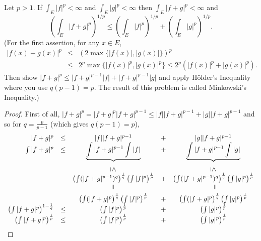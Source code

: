 \begin{pblm}%
	Let $p > 1$. If $\int_E|f|^p<\infty$ and $\int_E|g|^p<\infty$ then $\int_E|f+g|^p<\infty$ 
	and 
	\begin{equation*}
		\left(\int_E|f+g|^p\right)^{1/p} \le \left(\int_E|f|^p\right)^{1/p} + 
					\left(\int_E|g|^p\right)^{1/p}.
	\end{equation*}
	{\scriptsize{(For the first assertion, for any $x \in E$, 
	\begin{equation*}
	\begin{array}{rcl}
		|f(x)+g(x)|^p & \le &  (2\max\{|f(x)|,|g(x)|\})^p\\
				& \le & 2^p\max\{|f(x)|^p,|g(x)|^p\} 
				\le 2^p(|f(x)|^p + |g(x)|^p). 
	\end{array}
	\end{equation*}
	Then show $|f+g|^p \le |f+g|^{p-1}|f|+|f+g|^{p-1}|g|$ and apply H\"{o}lder's Inequality 
	where you use $q(p - 1) = p$. The result of this problem is called Minkowski's Inequality.)
	}}
\begin{proof}
	First of all,  $|f+g|^p = |f+g|^p|f+g|^{p-1} \le |f||f+g|^{p-1} + |g||f+g|^{p-1}$ 
	and so for $q = \frac{p}{p - 1}$ (which gives $q(p-1) = p$), 
	\begin{equation*}
	\begin{array}{rcccc}
		|f+g|^p  & \le & |f||f+g|^{p-1} & + & |g||f+g|^{p-1}\\
		\int |f+g|^p  & \le & \underbrace{\int|f+g|^{p-1}\int|f|}_{\vertle} & + & 
					\underbrace{\int|f+g|^{p-1}\int|g|}_{\vertle}\\
			&  & \left(\int(|f+g|^{p-1})^q\right)^\frac{1}{q}\left(\int|f|^p\right)^\frac{1}{p} & + & 
			     \left(\int(|f+g|^{p-1})^q\right)^\frac{1}{q}\left(\int|g|^p\right)^\frac{1}{p}\\
			& & \verteq & & ~~ \verteq \\
			&  & \left(\int(|f+g|^p\right)^\frac{1}{q}\left(\int|f|^p\right)^\frac{1}{p} & + & 
			     \left(\int(|f+g|^p\right)^\frac{1}{q}\left(\int|g|^p\right)^\frac{1}{p}\\
		\left(\int|f+g|^p\right)^{1-\frac{1}{q}} & \le & 
				\left(\int|f|^p\right)^\frac{1}{p} & + & \left(\int|g|^p\right)^\frac{1}{p}\\
		\left(\int|f+g|^p\right)^{\frac{1}{p}} & \le & 
				\left(\int|f|^p\right)^\frac{1}{p} & + & \left(\int|g|^p\right)^\frac{1}{p}
	\end{array}
	\end{equation*}
\end{proof}
\end{pblm}

